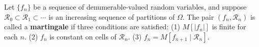 Let $\{f_n\}$ be a sequence of denumerable-valued random variables, and suppose $\mathcal{R}_0 \subset \mathcal{R}_1 \subset \cdots$ is an increasing sequence of partitions of $\Omega$. The pair $(f_n, \mathcal{R}_n)$ is called a \textbf{martingale} if three conditions are satisfied:
(1) $M[|f_n|]$ is finite for each $n$.
(2) $f_n$ is constant on cells of $\mathcal{R}_n$.
(3) $f_n = M[f_{n+1} \mid \mathcal{R}_n]$.